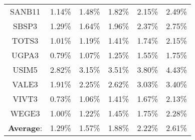 {\begin{table}[htbp]
\begin{center}
\begin{tabular}{|c|c|c|c|c|c|}
SANB11 &1.14\%&1.48\%&1.82\%&2.15\%&2.49\%\\ 
SBSP3 &1.29\%&1.64\%&1.96\%&2.37\%&2.75\%\\ 
TOTS3 &1.01\%&1.19\%&1.41\%&1.74\%&2.15\%\\ 
UGPA3 &0.79\%&1.07\%&1.25\%&1.55\%&1.75\%\\ 
USIM5 &2.82\%&3.15\%&3.51\%&3.80\%&4.43\%\\ 
VALE3 &1.91\%&2.25\%&2.62\%&3.03\%&3.40\%\\ 
VIVT3 &0.73\%&1.06\%&1.41\%&1.67\%&2.13\%\\ 
WEGE3 &1.00\%&1.22\%&1.45\%&1.75\%&2.28\%\\ 
\hline\textbf{Average}: &1.29\%&1.57\%&1.88\%&2.22\%&2.61\%\\ 
\hline
\end{tabular}
\label{tab1}
\end{center}
\end{table}
}

